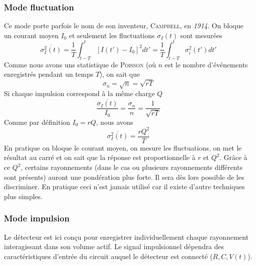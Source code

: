 	\subsubsection{Mode fluctuation}%
	Ce mode porte parfois le nom de son inventeur, 
	\textsc{Campbell}, en \textit{1914}. On bloque un courant 
	moyen $I_0$ et seulement les fluctuations $\sigma_I(t)$ sont
	mesurées
	\begin{equation}
	\overline{\sigma_I^2(t)}=\frac{1}{T}\int_{t-T}^t[I(t')-
	I_0]^2dt'=\frac{1}{T}\int_{t-T}^t\sigma_i^2(t')dt'
	\end{equation}		
	Comme nous avons uns statistique de \textsc{Poisson} (où $n$ 
	est le nombre d'événements enregistrés pendant un temps $T$), 
	on sait que
	\begin{equation}
	\sigma_n=\sqrt{n}=\sqrt{rT}
	\end{equation}
	Si chaque impulsion correspond à la même charge $Q$
	\begin{equation}
	\frac{\overline{\sigma_I(t)}}{I_0}=\frac{\sigma_n}{n}=\frac{1}
	{\sqrt{rT}}
	\end{equation}
	Comme par définition $I_0=rQ$, nous avons
	\begin{equation}
	\overline{\sigma_I^2(t)}=\frac{rQ^2}{T}
	\end{equation}
	En pratique on bloque le courant moyen, on mesure les 
	fluctuations, on met le résultat au carré et on sait que la 
	réponse est proportionnelle à $r$ et $Q^2$. Grâce à ce 
	$Q^2$, certains rayonnements (dans le cas ou plusieurs 
	rayonnements différents sont présents) auront une pondération
	plus forte. Il sera dès lors possible de les discriminer. En 
	pratique ceci n'est jamais utilisé car il existe d'autre 
	techniques plus simples.
	
	\subsubsection{Mode impulsion}%
	Le détecteur est ici conçu pour enregistrer individuellement
	chaque rayonnement interagissant dans son volume actif. Le 
	signal impulsionnel dépendra des caractéristiques d'entrée du 
	circuit auquel le détecteur est connecté ($R,C,V(t)$).\\

